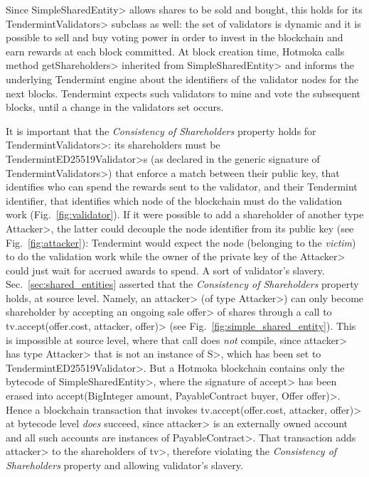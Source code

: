 Since \<SimpleSharedEntity> allows shares to be sold and bought, this holds for
its \<TendermintValidators> subclass as well: the set of validators
is dynamic and it is possible to sell and buy voting power in order to invest in the blockchain
and earn rewards at each block committed. At block creation time,
Hotmoka calls method \<getShareholders> inherited from
\<SimpleSharedEntity> and informs the
underlying Tendermint engine about the identifiers of the validator nodes for the next blocks.
Tendermint expects such validators to mine and vote the subsequent blocks, until a change in the
validators set occurs.

It is important that the \emph{Consistency of Shareholders} property holds
for \<TendermintValidators>: its shareholders
must be \<TendermintED25519Validator>s (as declared in the generic
signature of \<TendermintValidators>) that enforce a
match between their public key, that identifies who can spend the rewards sent to the validator,
and their Tendermint identifier, that identifies which node of the blockchain
must do the validation work (Fig.~\ref{fig:validator}).
If it were possible to add a shareholder of another
type \<Attacker>, the latter could decouple the node identifier from its
public key (see Fig.~\ref{fig:attacker}):
Tendermint would expect the node (belonging to the \emph{victim}) to do
the validation work while the owner
of the private key of the \<Attacker> could just wait for accrued awards to spend.
A sort of validator's slavery.
Sec.~\ref{sec:shared_entities} asserted that the \emph{Consistency of Shareholders}
property holds, at source level.
Namely, an \<attacker> (of type \<Attacker>) can only become shareholder
by accepting an ongoing sale \<offer> of shares through a call to
\<tv.accept(offer.cost, attacker, offer)> (see Fig.~\ref{fig:simple_shared_entity}).
This is impossible at source level, where that call does \emph{not} compile, since \<attacker> has type \<Attacker> that
is not an instance of \<S>, which has been set to \<TendermintED25519Validator>.
But a Hotmoka blockchain contains only the bytecode of \<SimpleSharedEntity>,
where the signature of \<accept> has been erased into
\<accept(BigInteger amount, PayableContract buyer, Offer offer)>.
Hence a blockchain transaction that invokes \<tv.accept(offer.cost, attacker, offer)>
at bytecode level
\emph{does} succeed, since \<attacker> is an externally owned account and all such accounts
are instances of \<PayableContract>.
That transaction adds \<attacker> to the shareholders of \<tv>,
therefore violating the \emph{Consistency of Shareholders} property and allowing
validator's slavery.


